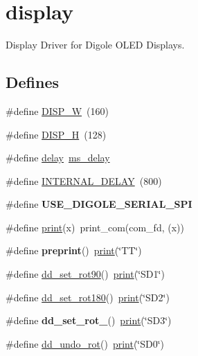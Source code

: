 \hypertarget{group__display}{\section{display}
\label{group__display}
}


\-Display \-Driver for \-Digole \-O\-L\-E\-D \-Displays.  


\subsection*{\-Defines}
\begin{DoxyCompactItemize}
\item 
\#define \hyperlink{group__display_ga34559df8b2eb42afb87d9b77e2be115e}{\-D\-I\-S\-P\-\_\-\-W}~(160)
\item 
\#define \hyperlink{group__display_ga3caed4fa6b4e84a4e630e733260300c1}{\-D\-I\-S\-P\-\_\-\-H}~(128)
\item 
\#define \hyperlink{group__display_gac16a222c648fdce7e5eb4f7e6cdb4d9d}{delay}~\hyperlink{group__display_gac8bd0fbcbea79baa54d11e5b5882b7cd}{ms\-\_\-delay}
\item 
\#define \hyperlink{group__display_gad77e166d8f5931c693952f5e89c2b732}{\-I\-N\-T\-E\-R\-N\-A\-L\-\_\-\-D\-E\-L\-A\-Y}~(800)
\item 
\hypertarget{group__display_ga739a5638f8592454e0c68591afc8cd86}{\#define {\bfseries \-U\-S\-E\-\_\-\-D\-I\-G\-O\-L\-E\-\_\-\-S\-E\-R\-I\-A\-L\-\_\-\-S\-P\-I}}\label{group__display_ga739a5638f8592454e0c68591afc8cd86}

\item 
\#define \hyperlink{group__display_ga0852287be3866e6ca5f85e48fca56dfe}{print}(x)~print\-\_\-com(com\-\_\-fd, (x))
\item 
\hypertarget{group__display_ga9a773540902f8b1ec1de5bc4d37b3827}{\#define {\bfseries preprint}()~\hyperlink{group__display_ga0852287be3866e6ca5f85e48fca56dfe}{print}(\char`\"{}\-T\-T\char`\"{})}\label{group__display_ga9a773540902f8b1ec1de5bc4d37b3827}

\item 
\#define \hyperlink{group__display_ga516fae68157b7ec6206f35d90e603413}{dd\-\_\-set\-\_\-rot90}()~\hyperlink{group__display_ga0852287be3866e6ca5f85e48fca56dfe}{print}(\char`\"{}\-S\-D1\char`\"{})
\item 
\#define \hyperlink{group__display_gad0d7548671b0db476d55e25d717bdd92}{dd\-\_\-set\-\_\-rot180}()~\hyperlink{group__display_ga0852287be3866e6ca5f85e48fca56dfe}{print}(\char`\"{}\-S\-D2\char`\"{})
\item 
\hypertarget{group__display_gae833937ec7507a662dd4d6c75d3535b1}{\#define {\bfseries dd\-\_\-set\-\_\-rot\-\_}()~\hyperlink{group__display_ga0852287be3866e6ca5f85e48fca56dfe}{print}(\char`\"{}\-S\-D3\char`\"{})}\label{group__display_gae833937ec7507a662dd4d6c75d3535b1}

\item 
\#define \hyperlink{group__display_ga3fdc97a4d3168e32eb20e626a045d4fb}{dd\-\_\-undo\-\_\-rot}()~\hyperlink{group__display_ga0852287be3866e6ca5f85e48fca56dfe}{print}(\char`\"{}\-S\-D0\char`\"{})
\end{DoxyCompactItemize}
